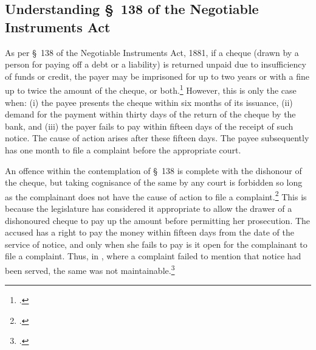 \documentclass[12pt,a4paper]{article}
\begin{document}
\newpage
\begin{appendices}

\section{Understanding \S~138 of the Negotiable Instruments Act} \label{app:understanding}

As per \S~138 of the Negotiable Instruments Act, 1881, if a cheque (drawn by a person for paying off a debt or a liability) is returned unpaid due to insufficiency of funds or credit, the payer may be imprisoned for up to two years or with a fine up to twice the amount of the cheque, or both.\footcite[A \textit{cheque} is defined as per \S~6 of the NI Act. It is a bill of exchange drawn on a specified banker and not expressed to be payable otherwise than on-demand. It includes the electronic image of a truncated cheque and a cheque in electronic form. Once a cheque has been signed and issued in favour of the cheque holder, there is a statutory presumption \S~139 of the NI Act that the cheque is issued in discharge of a legally enforceable debt or liability. However, said presumption is a rebuttable one. The issuer of the cheque can rebut that presumption by adducing credible evidence that the cheque was issued for some other purpose like security for a loan.][]{sc2018_murugun} However, this is only the case when: (i) the payee presents the cheque within six months of its issuance, (ii) demand for the payment within thirty days of the return of the cheque by the bank, and (iii) the payer fails to pay within fifteen days of the receipt of such notice. The cause of action arises after these fifteen days. The payee subsequently has one month to file a complaint before the appropriate court.

An offence within the contemplation of \S~138 is complete with the dishonour of the cheque, but taking cognisance of the same by any court is forbidden so long as the complainant does not have the cause of action to file a complaint.\footcite{sc2014_dashrath} This is because the legislature has considered it appropriate to allow the drawer of a dishonoured cheque to pay up the amount before permitting her prosecution. The accused has a right to pay the money within fifteen days from the date of the service of notice, and only when she fails to pay is it open for the complainant to file a complaint. Thus, in , where a complaint failed to mention that notice had been served, the same was not maintainable.\footcite{sc2002_shakti}


\end{appendices}
\end{document}
